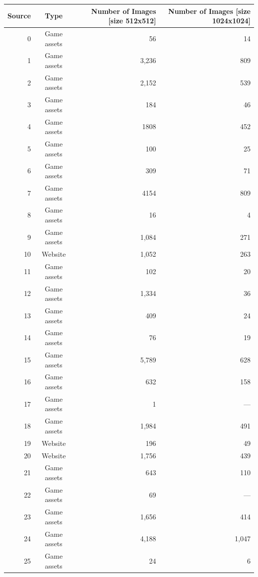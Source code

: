     \begin{table}[H]
        \centering
        \begin{adjustbox}{width=0.8\textwidth}
          \begin{tabular}{|r|c|r|r|}
              \hline
              Source & Type & Number of Images [size 512x512] & Number of Images [size 1024x1024] \\
              \hline
              0 & Game assets & 56 & 14 \\
              1 & Game assets & 3,236 & 809 \\
              2 & Game assets & 2,152 & 539 \\
              3 & Game assets & 184 & 46 \\
              4 & Game assets & 1808 & 452 \\
              5 & Game assets & 100 & 25 \\
              6 & Game assets & 309 & 71 \\
              7 & Game assets & 4154 & 809 \\
              8 & Game assets & 16 & 4 \\
              9 & Game assets & 1,084 & 271 \\
              10 & Website & 1,052 & 263 \\
              11 & Game assets & 102 & 20 \\
              12 & Game assets & 1,334 & 36 \\
              13 & Game assets & 409 & 24 \\
              14 & Game assets & 76 & 19 \\
              15 & Game assets & 5,789 & 628 \\
              16 & Game assets & 632 & 158 \\
              17 & Game assets & 1 & --- \\
              18 & Game assets & 1,984 & 491 \\
              19 & Website & 196 & 49 \\
              20 & Website & 1,756 & 439 \\
              21 & Game assets & 643 & 110 \\
              22 & Game assets & 69 & --- \\
              23 & Game assets & 1,656 & 414 \\
              24 & Game assets & 4,188 & 1,047 \\
              25 & Game assets & 24 & 6 \\

\end{tabular}
\end{adjustbox}
\end{table}
